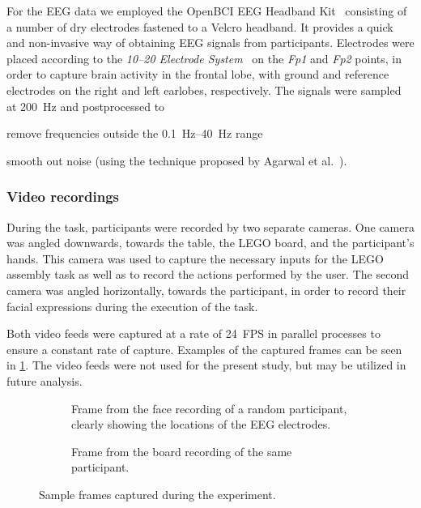 \documentclass[10pt,letterpaper]{article}
\begin{document}
For the EEG data we employed the OpenBCI EEG Headband Kit~\cite{openbci:headbandkit} consisting of a number of dry electrodes fastened to a Velcro headband.
It provides a quick and non-invasive way of obtaining EEG signals from participants.
Electrodes were placed according to the \emph{10--20 Electrode System}~\cite{eeg1020system:1961} on the \emph{Fp1} and \emph{Fp2} points, in order to capture brain activity in the frontal lobe, with ground and reference electrodes on the right and left earlobes, respectively.
The signals were sampled at \SI{200}{\hertz} and postprocessed to 
\begin{enumerate*}[itemjoin={{, }},
                  itemjoin*={{, and }},
                  label={{(\arabic*)}}]
  \item remove frequencies outside the \SIrange{0.1}{40}{\hertz} range
  \item smooth out noise (using the technique proposed by Agarwal et al.~\cite{agarwal2017eeg}).
\end{enumerate*}

\subsubsection{Video recordings}

During the task, participants were recorded by two separate cameras.
One camera was angled downwards, towards the table, the LEGO board, and the participant's hands.
This camera was used to capture the necessary inputs for the LEGO assembly task as well as to record the actions performed by the user.
The second camera was angled horizontally, towards the participant, in order to record their facial expressions during the execution of the task.

Both video feeds were captured at a rate of \num{24}~FPS in parallel processes to ensure a constant rate of capture.
Examples of the captured frames can be seen in \cref{fig:sampleframes}.
The video feeds were not used for the present study, but may be utilized in future analysis.

\begin{figure}[h]
  \centering
  \begin{subfigure}[t]{.35\textwidth}
    \centering
    \caption{Frame from the face recording of a random participant, clearly showing the locations of the EEG electrodes.}
  \end{subfigure}%
  \hfill%
  \begin{subfigure}[t]{.60\textwidth}
    \centering
    \caption{Frame from the board recording of the same participant.}
  \end{subfigure}
  \caption{Sample frames captured during the experiment.}\label{fig:sampleframes}
\end{figure}
\end{document}
